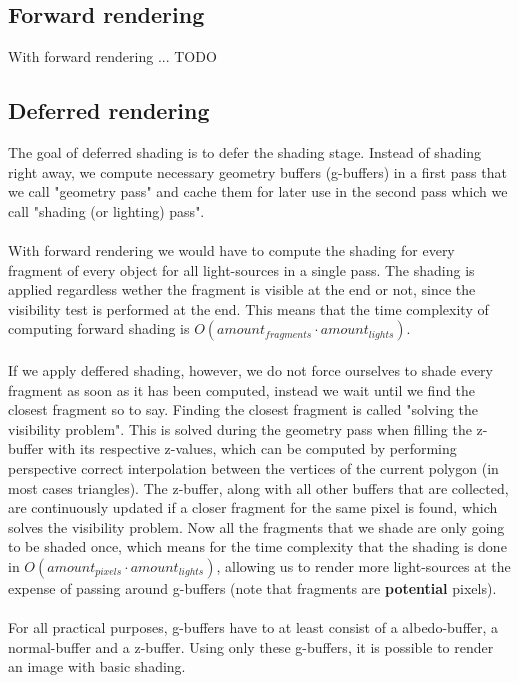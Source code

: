\documentclass{ACGSeminar}
\begin{document}
	\subsection{Forward rendering}
		With forward rendering ... TODO
	\subsection{Deferred rendering}
		The goal of deferred shading is to defer the shading stage. Instead of shading right away, we compute necessary geometry buffers (g-buffers) in a first pass that we call "geometry pass" and cache 
		them for later use in the second pass which we call "shading (or lighting) pass". \\\\
		With forward rendering we would have to compute the shading for every fragment of every object for all light-sources in a single pass. The shading is applied regardless wether the fragment is visible at the end or not, since the visibility test is performed at the end. This means that the time complexity of computing forward shading is $O(amount_{fragments} \cdot amount_{lights})$. \\\\
		If we apply deffered shading, however, we do not force ourselves to shade every fragment as soon as it has been computed, instead we wait until we find the closest fragment so to say. Finding the closest fragment is called "solving the visibility problem". This is solved during the geometry pass when filling the z-buffer with its respective z-values, which can be computed by performing perspective correct interpolation between the vertices of the current polygon (in most cases triangles). The z-buffer, along with all other buffers that are collected, are continuously updated if a closer fragment for the same pixel is found, which solves the visibility problem. Now all the fragments that we shade are only going to be shaded once, which means for the time complexity that the shading is done in $O(amount_{pixels} \cdot amount_{lights})$, allowing us to render more light-sources at the expense of passing around g-buffers (note that fragments are \textbf{potential} pixels). \\\\
		For all practical purposes, g-buffers have to at least consist of a albedo-buffer, a normal-buffer and a z-buffer. Using only these g-buffers, it is possible to render an image with basic shading.
\end{document}

